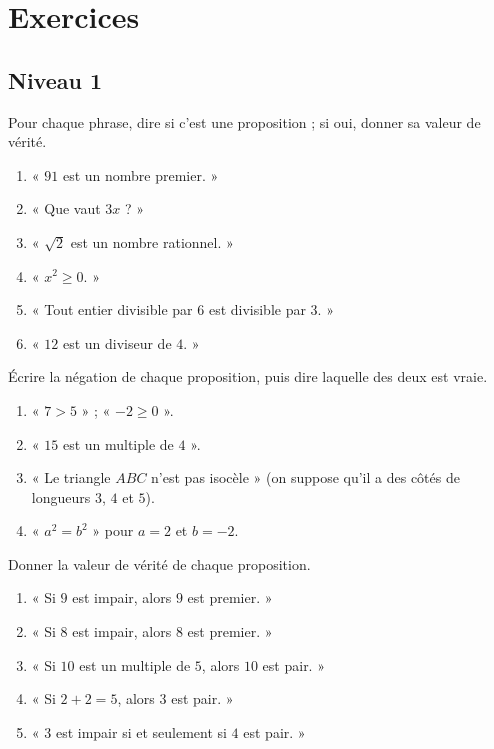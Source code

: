 \section{Exercices}
\subsection*{Niveau 1}
\begin{exercise}
Pour chaque phrase, dire si c'est une proposition ; si oui, donner sa valeur de vérité.
\begin{enumerate}
\item « $91$ est un nombre premier. »
\item « Que vaut $3x$ ? »
\item « $\sqrt2$ est un nombre rationnel. »
\item « $x^2\ge0$. »
\item « Tout entier divisible par $6$ est divisible par $3$. »
\item « $12$ est un diviseur de $4$. »
\end{enumerate}
\end{exercise}
\begin{exercise}
Écrire la négation de chaque proposition, puis dire laquelle des deux est vraie.
\begin{enumerate}
\item « $7>5$ » ; \quad « $-2\ge0$ ».
\item « $15$ est un multiple de $4$ ».
\item « Le triangle $ABC$ n'est pas isocèle » (on suppose qu'il a des côtés de longueurs $3$, $4$ et $5$).
\item « $a^2=b^2$ » pour $a=2$ et $b=-2$.
\end{enumerate}
\end{exercise}
\begin{exercise}
Donner la valeur de vérité de chaque proposition.
\begin{enumerate}
\item « Si $9$ est impair, alors $9$ est premier. »
\item « Si $8$ est impair, alors $8$ est premier. »
\item « Si $10$ est un multiple de $5$, alors $10$ est pair. »
\item « Si $2+2=5$, alors $3$ est pair. »
\item « $3$ est impair si et seulement si $4$ est pair. »
\end{enumerate}
\end{exercise}

